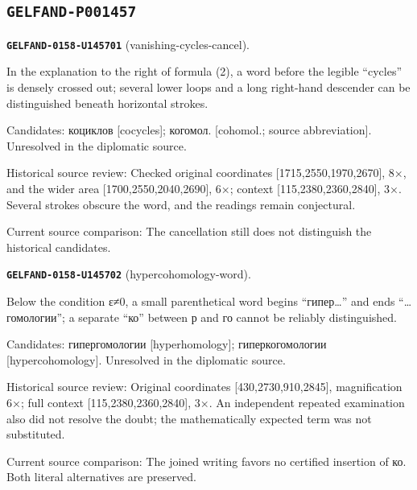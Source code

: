 \subsection*{\texttt{GELFAND-P001457}}
\par\noindent\leavevmode{}\label{GELFAND-0158-U145701}\label{GELFAND-P001457:vanishing-cycles-cancel}\textbf{\texttt{GELFAND-0158-U145701}} (vanishing-cycles-cancel).\nopagebreak[4]\par
In the explanation to the right of formula (2), a word before the legible “cycles” is densely crossed out; several lower loops and a long right-hand descender can be distinguished beneath horizontal strokes.\par
Candidates: коциклов [cocycles]; когомол. [cohomol.; source abbreviation]. Unresolved in the diplomatic source.\par
Historical source review: Checked original coordinates [1715,2550,1970,2670], 8×, and the wider area [1700,2550,2040,2690], 6×; context [115,2380,2360,2840], 3×. Several strokes obscure the word, and the readings remain conjectural.\par
Current source comparison: The cancellation still does not distinguish the historical candidates.\par\medskip
\par\noindent\leavevmode{}\label{GELFAND-0158-U145702}\label{GELFAND-P001457:hypercohomology-word}\textbf{\texttt{GELFAND-0158-U145702}} (hypercohomology-word).\nopagebreak[4]\par
Below the condition ε≠0, a small parenthetical word begins “гипер…” and ends “…гомологии”; a separate “ко” between р and го cannot be reliably distinguished.\par
Candidates: гипергомологии [hyperhomology]; гиперкогомологии [hypercohomology]. Unresolved in the diplomatic source.\par
Historical source review: Original coordinates [430,2730,910,2845], magnification 6×; full context [115,2380,2360,2840], 3×. An independent repeated examination also did not resolve the doubt; the mathematically expected term was not substituted.\par
Current source comparison: The joined writing favors no certified insertion of ко. Both literal alternatives are preserved.\par\medskip
